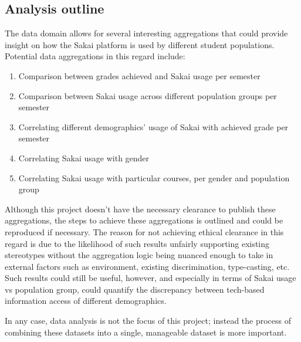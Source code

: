\subsection{Analysis outline}
The data domain allows for several interesting aggregations that could provide insight on how the Sakai platform is used by different student populations. Potential data aggregations in this regard include:

\begin{enumerate}
  \item Comparison between grades achieved and Sakai usage per semester
  \item Comparison between Sakai usage across different population groups per semester
  \item Correlating different demographics' usage of Sakai with achieved grade per semester
  \item Correlating Sakai usage with gender
  \item Correlating Sakai usage with particular courses, per gender and population group
\end{enumerate}

Although this project doesn't have the necessary clearance to publish these aggregations, the steps to achieve these aggregations is outlined and could be reproduced if necessary. The reason for not achieving ethical clearance in this regard is due to the likelihood of such results unfairly supporting existing stereotypes without the aggregation logic being nuanced enough to take in external factors such as environment, existing discrimination, type-casting, etc. Such results could still be useful, however, and especially in terms of Sakai usage vs population group, could quantify the discrepancy between tech-based information access of different demographics.

In any case, data analysis is not the focus of this project; instead the process of combining these datasets into a single, manageable dataset is more important.